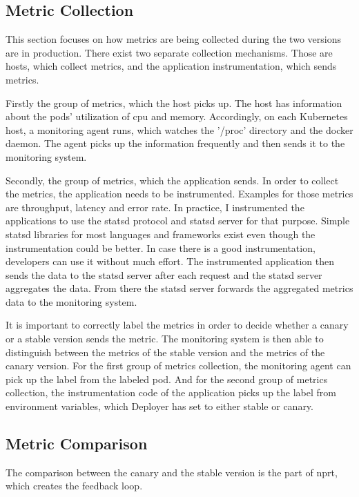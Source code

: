 \subsection{Metric Collection}

This section focuses on how metrics are being collected during the two versions are in
production. There exist two separate collection mechanisms. Those are hosts, which collect
metrics, and the application instrumentation, which sends metrics.

Firstly the group of metrics, which the host picks up. The host has information about the
pods' utilization of cpu and memory. Accordingly, on each Kubernetes host, a monitoring
agent runs, which watches the '/proc' directory and the docker daemon. The agent picks up
the information frequently and then sends it to the monitoring system.

Secondly, the group of metrics, which the application sends. In order to collect the
metrics, the application needs to be instrumented. Examples for those metrics are
throughput, latency and error rate. In practice, I instrumented the applications to use the
statsd protocol and statsd server for that purpose. Simple statsd libraries for most
languages and frameworks exist even though the instrumentation could be better. In case
there is a good instrumentation, developers can use it without much effort. The
instrumented application then sends the data to the statsd server after each request and
the statsd server aggregates the data. From there the statsd server forwards the
aggregated metrics data to the monitoring system.

It is important to correctly label the metrics in order to decide whether a canary or a
stable version sends the metric. The monitoring system is then able to distinguish between
the metrics of the stable version and the metrics of the canary version. For the first
group of metrics collection, the monitoring agent can pick up the label from the labeled
pod. And for the second group of metrics collection, the instrumentation code of the
application picks up the label from environment variables, which Deployer has set to
either stable or canary.

\subsection{Metric Comparison}
\label{sec:metric_comparison}

The comparison between the canary and the stable version is the part of \gls{nprt}, which
creates the feedback loop.

